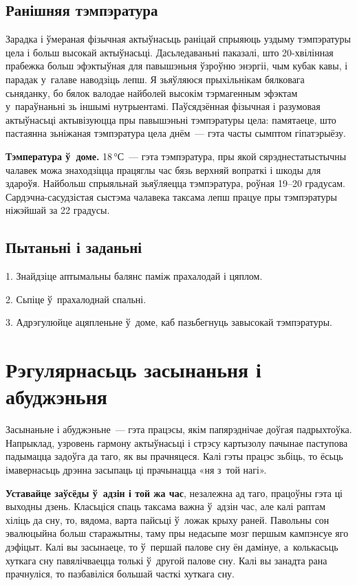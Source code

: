 \subsection*{Ранішняя тэмпэратура}

Зарадка і ўмераная фізычная актыўнасьць раніцай спрыяюць уздыму тэмпэратуры цела і больш высокай актыўнасьці. Дасьледаваньні паказалі, што 20-хвілінная прабежка больш эфэктыўная для павышэньня ўзроўню энэргіі, чым кубак кавы, і парадак у~галаве наводзіць лепш. Я зьяўляюся прыхільнікам бялковага сьняданку, бо бялок валодае найболей высокім тэрмагенным эфэктам у~параўнаньні зь іншымі нутрыентамі. Паўсядзённая фізычная і разумовая актыўнасьці актывізуюцца пры павышэньні тэмпэратуры цела: памятаеце, што пастаянна зьніжаная тэмпэратура цела днём~--- гэта часты сымптом гіпатэрыёзу.

\textbf{Тэмпература ў~доме.} 18\,°С~--- гэта тэмпэратура, пры якой сярэднестатыстычны чалавек можа знаходзіцца працяглы час бязь верхняй вопраткі і шкоды для здароўя. Найбольш спрыяльнай зьяўляецца тэмпэратура, роўная 19--20 градусам. Сардэчна-сасудзістая сыстэма чалавека таксама лепш працуе пры тэмпэратуры ніжэйшай за 22 градусы.

\subsection*{Пытаньні і заданьні}

1. Знайдзіце аптымальны балянс паміж прахалодай і цяплом.

2. Сьпіце ў~прахалоднай спальні.

3. Адрэгулюйце ацяпленьне ў~доме, каб пазьбегнуць завысокай тэмпэратуры.


\section{Рэгулярнасьць засынаньня і абуджэньня}

Засынаньне і абуджэньне~--- гэта працэсы, якім папярэднічае доўгая падрыхтоўка. Напрыклад, узровень гармону актыўнасьці і стрэсу картызолу пачынае паступова падымацца задоўга да таго, як вы прачняцеся. Калі гэты працэс зьбіць, то ёсьць імавернасьць дрэнна засыпаць ці прачынацца «ня з~той нагі». 


\textbf{Уставайце заўсёды ў~адзін і той жа час}, незалежна ад таго, працоўны гэта ці выходны дзень. Класьціся спаць таксама важна ў~адзін час, але калі раптам хіліць да сну, то, вядома, варта пайсьці ў~ложак крыху раней. Павольны сон эвалюцыйна больш старажытны, таму пры недасыпе мозг першым кампэнсуе яго дэфіцыт. Калі вы засынаеце, то ў~першай палове сну ён дамінуе, а~колькасьць хуткага сну павялічваецца толькі ў~другой палове сну. Калі вы занадта рана прачнуліся, то пазбавіліся большай часткі хуткага сну.

